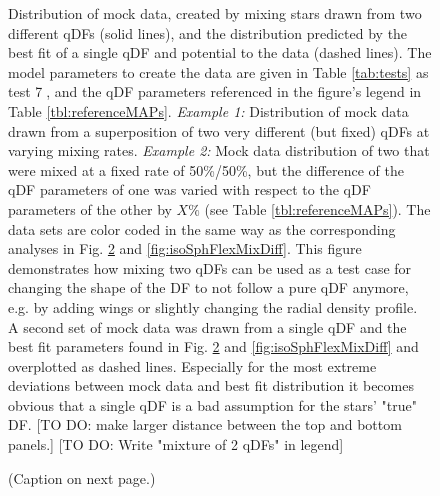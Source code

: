

\begin{figure}
\caption{Distribution of mock data, created by mixing stars drawn from two different qDFs (solid lines), and the distribution predicted by the best fit of a single qDF and potential to the data (dashed lines). The model parameters to create the data are given in Table \ref{tab:tests} as test \textcircled{7}, and the qDF parameters referenced in the figure's legend in Table \ref{tbl:referenceMAPs}. \emph{Example 1:} Distribution of mock data drawn from a superposition of two very different (but fixed) qDFs at varying mixing rates. \emph{Example 2:} Mock data distribution of two \MAPs that were mixed at a fixed rate of 50\%/50\%, but the difference of the qDF parameters of one \MAP was varied with respect to the qDF parameters of the other \MAP by $X\%$ (see Table \ref{tbl:referenceMAPs}). The data sets are color coded in the same way as the corresponding analyses in Fig.  \ref{fig:isoSphFlexMixCont} and \ref{fig:isoSphFlexMixDiff}. This figure demonstrates how mixing two qDFs can be used as a test case for changing the shape of the DF to not follow a pure qDF anymore, e.g. by adding wings or slightly changing the radial density profile. A second set of mock data was drawn from a single qDF and the best fit parameters found in Fig.  \ref{fig:isoSphFlexMixCont} and \ref{fig:isoSphFlexMixDiff} and overplotted as dashed lines. Especially for the most extreme deviations between mock data and best fit distribution it becomes obvious that a single qDF is a bad assumption for the stars' "true" DF. [TO DO: make larger distance between the top and bottom panels.] [TO DO: Write "mixture of 2 qDFs" in legend]}
\label{fig:isoSphFlexMix_mockdata_residuals}
\end{figure}



\begin{figure}
\caption{(Caption on next page.)}
\label{fig:isoSphFlexMixCont}
\end{figure}

